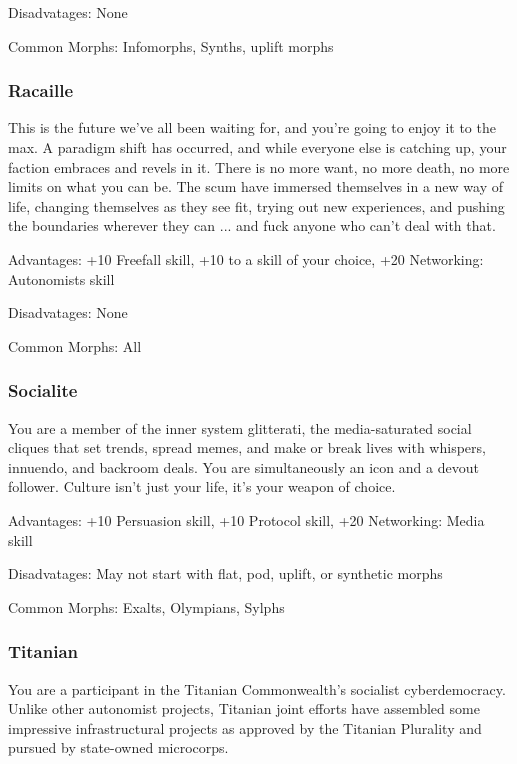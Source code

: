 Disadvatages: None 

Common Morphs: Infomorphs, Synths, uplift morphs 

\subsubsection{Racaille} \label{sec:background-scum} 

This is the future we’ve all been waiting for, and you’re going to enjoy it to the max. A paradigm shift has occurred, and while everyone else is catching up, your faction embraces and revels in it. There is no more want, no more death, no more limits on what you can be. The scum have immersed themselves in a new way of life, changing themselves as they see fit, trying out new experiences, and pushing the boundaries wherever they can ... and fuck anyone who can’t deal with that. 

Advantages: +10 Freefall skill, +10 to a skill of your choice, +20 Networking: Autonomists skill 

Disadvatages: None 

Common Morphs: All 

\subsubsection{Socialite} \label{sec:socialite} You are a member of the inner system glitterati, the media-saturated social cliques that set trends, spread memes, and make or break lives with whispers, innuendo, and backroom deals. You are simultaneously an icon and a devout follower. Culture isn’t just your life, it’s your weapon of choice. 

Advantages: +10 Persuasion skill, +10 Protocol skill, +20 Networking: Media skill 

Disadvatages: May not start with flat, pod, uplift, or synthetic morphs 

Common Morphs: Exalts, Olympians, Sylphs 

\subsubsection{Titanian} \label{sec:titanian} 

You are a participant in the Titanian Commonwealth’s socialist cyberdemocracy. Unlike other autonomist projects, Titanian joint efforts have assembled some impressive infrastructural projects as approved by the Titanian Plurality and pursued by state-owned microcorps. 

